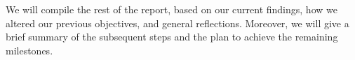 We will compile the rest of the report, based on our current findings, how we altered our previous objectives, 
and general reflections. Moreover, we will give a brief summary of the subsequent steps
and the plan to achieve the remaining milestones.


%
%
%
%
%
%
%
%
%
%
%
%
%
%
%
